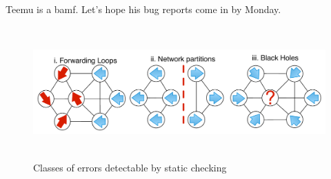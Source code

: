 
Teemu is a bamf. Let's hope his bug reports come in by Monday.

\begin{figure}[t]
    \centering
    \includegraphics[height=2in,width=6in]{../diagrams/bugs/basic_invariants.pdf}
    \caption[]{\label{fig:loop} Classes of errors detectable by static
    checking\vspace{-10pt}} 
\end{figure}

